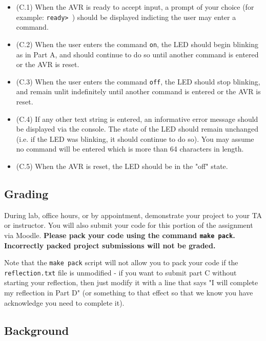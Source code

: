 \documentclass{article}
\begin{document}
\begin{itemize}

	\item (C.1) When the AVR is ready to accept input, a prompt of your
	choice (for example: \texttt{ready> }) should be displayed indicting the
	user may enter a command.

	\item (C.2) When the user enters the command \texttt{on}, the LED
	should begin blinking as in Part A, and should continue to do so
	until another command is entered or the AVR is reset.

	\item (C.3) When the user enters the command \texttt{off}, the LED
	should stop blinking, and remain unlit indefinitely until another
	command is entered or the AVR is reset.

	\item (C.4) If any other text string is entered, an informative error
	message should be displayed via the console. The state of the LED
	should remain unchanged (i.e. if the LED was blinking, it should
	continue to do so). You may assume no command will be entered which is
	more than 64 characters in length.

	\item (C.5) When the AVR is reset, the LED should be in the "off"
	state.

\end{itemize}

\subsection{Grading}

During lab, office hours, or by appointment, demonstrate your project to your
TA or instructor.  You will also submit your code for this portion of the
assignment via Moodle.  \textbf{Please pack your code using the command
\texttt{make pack}.  Incorrectly packed project submissions will not be
graded.}

Note that the \texttt{make pack} script will not allow you to pack your code if
the \texttt{reflection.txt} file is unmodified - if you want to submit part C
without starting your reflection, then just modify it with a line that says "I
will complete my reflection in Part D" (or something to that effect so that we
know you have acknowledge you need to complete it).

\subsection{Background}
\end{document}
